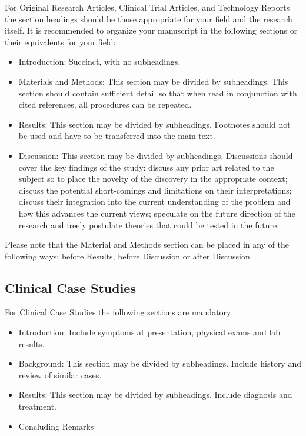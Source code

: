 \documentclass{frontiersMED} %
\begin{document}
For Original Research Articles, Clinical Trial Articles, and Technology Reports the section headings should be those appropriate for your field and the research itself. It is recommended to organize your manuscript in the following sections or their equivalents for your field:

\begin{itemize}
\item Introduction: Succinct, with no subheadings.
\item Materials and Methods: This section may be divided by subheadings. This section should contain sufficient detail so that when read in conjunction with cited references, all procedures can be repeated.
\item Results: This section may be divided by subheadings. Footnotes should not be used and have to be transferred into the main text.
\item Discussion: This section may be divided by subheadings. Discussions should cover the key findings of the study: discuss any prior art related to the subject so to place the novelty of the discovery in the appropriate context; discuss the potential short-comings and limitations on their interpretations; discuss their integration into the current understanding of the problem and how this advances the current views; speculate on the future direction of the research and freely postulate theories that could be tested in the future.
\end{itemize}

Please note that the Material and Methods section can be placed in any of the following ways: before Results, before Discussion or after Discussion.

\subsection{Clinical Case Studies}

For Clinical Case Studies the following sections are mandatory:

\begin{itemize}
\item Introduction: Include symptoms at presentation, physical exams and lab results.
\item Background: This section may be divided by subheadings. Include history and review of similar cases.
\item Results: This section may be divided by subheadings. Include diagnosis and treatment.
\item Concluding Remarks
\end{itemize}
\end{document}
